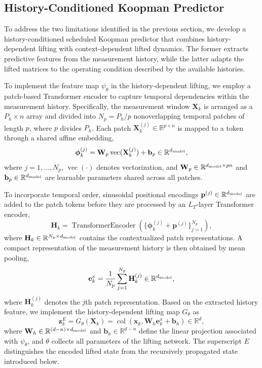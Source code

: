 \documentclass[journal]{IEEEtran}
\newcommand{\vphi}{\boldsymbol{\phi}}
\newcommand{\vp}{\mathbf{p}}
\newcommand{\vb}{\mathbf{b}}
\newcommand{\vx}{\mathbf{x}}
\newcommand{\ve}{\mathbf{e}}
\newcommand{\vz}{\mathbf{z}}
\newcommand{\mH}{\mathbf{H}}
\newcommand{\mW}{\mathbf{W}}
\newcommand{\mX}{\mathbf{X}}
\newcommand{\R}{\mathbb{R}}
\newcommand{\col}{\operatorname{col}}
\theoremstyle{plain}
\theoremstyle{definition}
\theoremstyle{definition}
\begin{document}
\subsection{History-Conditioned Koopman Predictor}
\label{sec:temporal_lifting}

To address the two limitations identified in the previous section,
we develop a history-conditioned scheduled Koopman predictor that
combines history-dependent lifting with context-dependent lifted
dynamics. The former extracts predictive features from the
measurement history, while the latter adapts the lifted matrices
to the operating condition described by the available histories.

To implement the feature map $\psi_\theta$ in the history-dependent
lifting, we employ a patch-based Transformer encoder to capture
temporal dependencies within the measurement history. Specifically,
the measurement window $\mX_k$ is arranged as a $P_h\times n$
array and divided into $N_p=P_h/p$ nonoverlapping temporal patches
of length $p$, where $p$ divides $P_h$. Each patch
$\mX_k^{(j)}\in\R^{p\times n}$ is mapped to a token through
a shared affine embedding,
\begin{equation}
\vphi_k^{(j)}
=\mW_p\operatorname{vec}(\mX_k^{(j)})+\vb_p
\in\R^{d_{\rm model}},
\label{eq:patch_embedding}
\end{equation}
where $j=1,\ldots,N_p$, $\operatorname{vec}(\cdot)$ denotes
vectorization, and $\mW_p\in\R^{d_{\rm model}\times pn}$
and $\vb_p\in\R^{d_{\rm model}}$ are learnable parameters
shared across all patches.

To incorporate temporal order, sinusoidal positional encodings
$\vp^{(j)}\in\R^{d_{\rm model}}$ \cite{vaswani2017attention}
are added to the patch tokens before they are processed by an
$L_T$-layer Transformer encoder,
\begin{equation}
\mH_k=\operatorname{TransformerEncoder}
\left(\{\vphi_k^{(j)}+\vp^{(j)}\}_{j=1}^{N_p}\right),
\label{eq:transformer_encoder}
\end{equation}
where $\mH_k\in\R^{N_p\times d_{\rm model}}$ contains the
contextualized patch representations. A compact representation
of the measurement history is then obtained by mean pooling,
\begin{equation}
\ve_k^x=\frac{1}{N_p}\sum_{j=1}^{N_p}\mH_k^{(j)}
\in\R^{d_{\rm model}},
\label{eq:pooled_history_feature}
\end{equation}
where $\mH_k^{(j)}$ denotes the $j$th patch representation.
Based on the extracted history feature, we implement the
history-dependent lifting map $G_\theta$ as
\begin{equation}
\vz_k^E=G_\theta(\mX_k)
=\col(\vx_k,\mW_h\ve_k^x+\vb_h)\in\R^d,
\label{eq:lifting_head}
\end{equation}
where $\mW_h\in\R^{(d-n)\times d_{\rm model}}$ and
$\vb_h\in\R^{d-n}$ define the linear projection associated
with $\psi_\theta$, and $\theta$ collects all parameters
of the lifting network. The superscript $E$ distinguishes
the encoded lifted state from the recursively propagated
state introduced below.
\end{document}
